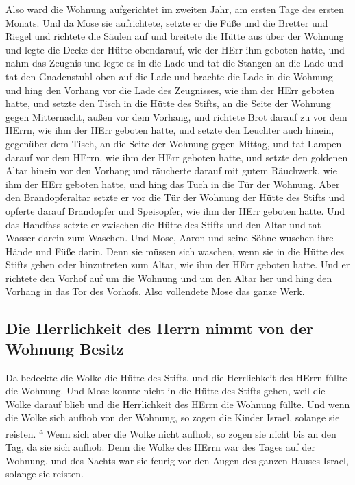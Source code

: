  Also ward die Wohnung aufgerichtet im zweiten Jahr, am
ersten Tage des ersten Monats.  Und da Mose sie
aufrichtete, setzte er die Füße und die Bretter und Riegel und richtete
die Säulen auf  und breitete die Hütte aus über der
Wohnung und legte die Decke der Hütte obendarauf, wie der HErr ihm
geboten hatte,  und nahm das Zeugnis und legte es in die
Lade und tat die Stangen an die Lade und tat den Gnadenstuhl oben auf
die Lade  und brachte die Lade in die Wohnung und hing
den Vorhang vor die Lade des Zeugnisses, wie ihm der HErr geboten hatte,
 und setzte den Tisch in die Hütte des Stifts, an die
Seite der Wohnung gegen Mitternacht, außen vor dem Vorhang,
 und richtete Brot darauf zu vor dem HErrn, wie ihm der
HErr geboten hatte,  und setzte den Leuchter auch hinein,
gegenüber dem Tisch, an die Seite der Wohnung gegen Mittag,
 und tat Lampen darauf vor dem HErrn, wie ihm der HErr
geboten hatte,  und setzte den goldenen Altar hinein vor
den Vorhang  und räucherte darauf mit gutem Räuchwerk,
wie ihm der HErr geboten hatte,  und hing das Tuch in die
Tür der Wohnung.  Aber den Brandopferaltar setzte er vor
die Tür der Wohnung der Hütte des Stifts und opferte darauf Brandopfer
und Speisopfer, wie ihm der HErr geboten hatte.  Und das
Handfass setzte er zwischen die Hütte des Stifts und den Altar und tat
Wasser darein zum Waschen.  Und Mose, Aaron und seine
Söhne wuschen ihre Hände und Füße darin.  Denn sie müssen
sich waschen, wenn sie in die Hütte des Stifts gehen oder hinzutreten
zum Altar, wie ihm der HErr geboten hatte.  Und er
richtete den Vorhof auf um die Wohnung und um den Altar her und hing den
Vorhang in das Tor des Vorhofs. Also vollendete Mose das ganze Werk.

\hypertarget{die-herrlichkeit-des-herrn-nimmt-von-der-wohnung-besitz}{%
\subsection{Die Herrlichkeit des Herrn nimmt von der Wohnung
Besitz}\label{die-herrlichkeit-des-herrn-nimmt-von-der-wohnung-besitz}}

 Da bedeckte die Wolke die Hütte des Stifts, und die
Herrlichkeit des HErrn füllte die Wohnung.  Und Mose
konnte nicht in die Hütte des Stifts gehen, weil die Wolke darauf blieb
und die Herrlichkeit des HErrn die Wohnung füllte.  Und
wenn die Wolke sich aufhob von der Wohnung, so zogen die Kinder Israel,
solange sie reisten. \textsuperscript{a}  Wenn sich aber
die Wolke nicht aufhob, so zogen sie nicht bis an den Tag, da sie sich
aufhob.  Denn die Wolke des HErrn war des Tages auf der
Wohnung, und des Nachts war sie feurig vor den Augen des ganzen Hauses
Israel, solange sie reisten.

